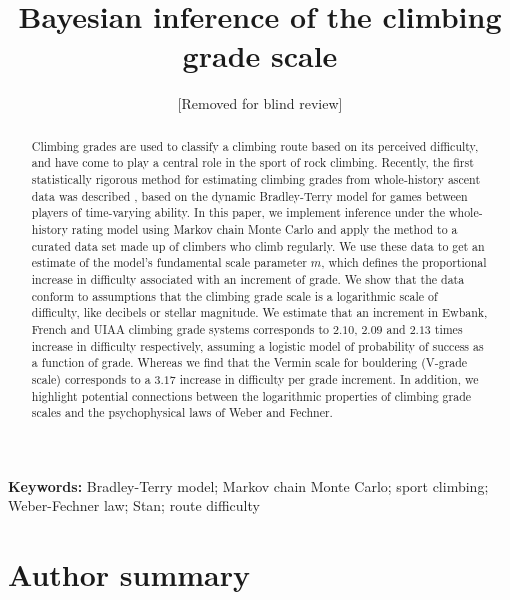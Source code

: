 \documentclass[12pt]{article}
\newcommand{\ewbankslope}{2.10} %
\newcommand{\frenchslope}{2.09}
\newcommand{\uiaaslope}{2.13}
\newcommand{\verminslope}{3.17}
\begin{document}
\title{Bayesian inference of the climbing grade scale}

\author{[Removed for blind review]}

\date{}

\maketitle

\begin{abstract}
Climbing grades are used to classify a climbing route based on its perceived difficulty, and have come to play a central role in the sport of rock climbing. Recently, the first statistically rigorous method for estimating climbing grades from whole-history ascent data was described \citep{scarff2020estimation}, based on the dynamic Bradley-Terry model for games between players of time-varying ability. In this paper, we implement inference under the whole-history rating model using Markov chain Monte Carlo and apply the method to a curated data set made up of climbers who climb regularly. We use these data to get an estimate of the model's fundamental scale parameter $m$, which defines the proportional increase in difficulty associated with an increment of grade. We show that the data conform to assumptions that the climbing grade scale is a logarithmic scale of difficulty, like decibels or stellar magnitude. We estimate that an increment in Ewbank, French and UIAA climbing grade systems corresponds to $\ewbankslope{}$, $\frenchslope{}$ and $\uiaaslope$ times increase in difficulty respectively, assuming a logistic model of probability of success as a function of grade. Whereas we find that the Vermin scale for bouldering (V-grade scale) corresponds to a $\verminslope$ increase in difficulty per grade increment. In addition, we highlight potential connections between the logarithmic properties of climbing grade scales and the psychophysical laws of Weber and Fechner.
\end{abstract}

\noindent\textbf{Keywords:} Bradley-Terry model; Markov chain Monte Carlo; sport climbing; Weber-Fechner law; Stan; route difficulty

\section{Author summary}
\end{document}
